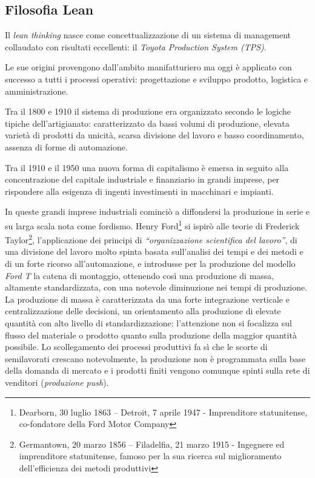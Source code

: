 \subsection{Filosofia Lean}
Il \textit{lean thinking} nasce come concettualizzazione di un sistema di management collaudato con risultati eccellenti: il \textit{Toyota Production System (TPS)}.

Le sue origini provengono dall’ambito manifatturiero ma oggi è applicato con successo a tutti i processi operativi: progettazione e sviluppo prodotto, logistica e amministrazione.

Tra il 1800 e 1910 il sistema di produzione era organizzato secondo le logiche tipiche dell’artigianato: caratterizzato da bassi volumi di produzione, elevata varietà di prodotti da unicità, scarsa divisione del lavoro e basso coordinamento, assenza di forme di automazione.

Tra il 1910 e il 1950 una nuova forma di capitalismo è emersa in seguito alla concentrazione del capitale industriale e finanziario in grandi imprese, per rispondere alla esigenza di ingenti investimenti in macchinari e impianti.

In queste grandi imprese industriali cominciò a diffondersi la produzione in serie e su larga scala nota come fordismo. Henry Ford\footnote{Dearborn, 30 luglio 1863 – Detroit, 7 aprile 1947 - Imprenditore statunitense, co-fondatore della Ford Motor Company} si ispirò alle teorie di Frederick Taylor\footnote{Germantown, 20 marzo 1856 – Filadelfia, 21 marzo 1915 - Ingegnere ed imprenditore statunitense, famoso per la sua ricerca sul miglioramento dell'efficienza dei metodi produttivi}, l’applicazione dei principi di \textit{“organizzazione scientifica del lavoro”}, di una divisione del lavoro molto spinta basata sull’analisi dei tempi e dei metodi e di un forte ricorso all’automazione, e introdusse per la produzione del modello \textit{Ford T} la catena di montaggio, ottenendo così una produzione di massa, altamente standardizzata, con una notevole diminuzione nei tempi di produzione. La produzione di massa è caratterizzata da una forte integrazione verticale e centralizzazione delle decisioni, un orientamento alla produzione di elevate quantità con alto livello di standardizzazione: l’attenzione non si focalizza sul flusso del materiale o prodotto quanto sulla produzione della maggior quantità possibile. Lo scollegamento dei processi produttivi fa sì che le scorte di semilavorati crescano notevolmente, la produzione non è programmata sulla base della domanda di mercato e i prodotti finiti vengono comunque spinti sulla rete di venditori (\textit{produzione push}).


